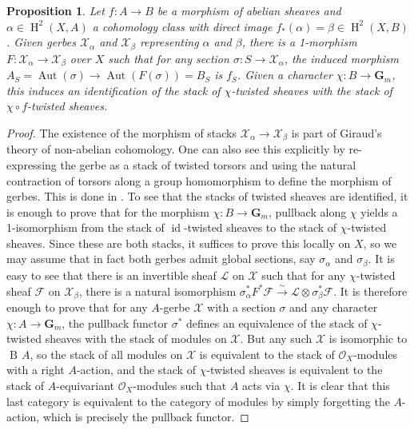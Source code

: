 \documentclass[11pt]{amsart}
\newcommand{\field}[1]{\mathbf #1}
\newcommand{\ms}[1]{\mathscr #1}
\newcommand{\simto}{\stackrel{\sim}{\to}}
\newcommand{\G}{\field G} %
\renewcommand{\H}{\operatorname{H}}
\renewcommand{\[}{[\!\hspace{0.03em}[}
\renewcommand{\]}{]\!\hspace{0.03em}]}
\renewcommand{\(}{(\!\hspace{0.03em}(}
\renewcommand{\)}{)\!\hspace{0.03em})}
\DeclareMathOperator*{\tensor}{\otimes}
\newcommand{\id}{\operatorname{id}}
\DeclareMathOperator{\aut}{\operatorname{Aut}}
\DeclareMathOperator{\B}{\operatorname{B\!}}
\newtheorem{prop}[lem]{Proposition}
\theoremstyle{definition}
\theoremstyle{remark}
\begin{document}
\begin{prop}\label{L:comparison of gerbes} Let $f:A\to B$ be a morphism of abelian sheaves and 
$\alpha\in\H^{2}(X,A)$ a cohomology class with direct image
$f_{\ast}(\alpha)=\beta\in\H^{2}(X,B)$.  Given gerbes $\ms X_{\alpha}$ and $\ms 
X_{\beta}$ representing $\alpha$ and $\beta$, there is a 1-morphism 
$F:\ms X_{\alpha}\to\ms X_{\beta}$ over $X$ such that for any 
section $\sigma:S\to\ms X_{\alpha}$, the induced morphism 
$A_{S}=\aut(\sigma)\to\aut(F(\sigma))=B_{S}$ is $f_{S}$.  Given a character $\chi:B\to\G_m$, this induces an identification of the stack of $\chi$-twisted sheaves with the stack of $\chi\circ f$-twisted sheaves.
\end{prop}
\begin{proof} The existence of the morphism of stacks $\ms 
X_{\alpha}\to\ms X_{\beta}$ is part of 
Giraud's theory of non-abelian cohomology.  One can also see this 
explicitly by re-expressing the gerbe as a stack of twisted torsors and using the natural contraction of torsors along a group homomorphism to define the morphism of gerbes.  
This is done in \cite{mythesis}.  To see that the stacks of twisted sheaves are identified, it is enough to prove that for the morphism $\chi:B\to\G_m$, pullback along $\chi$ yields a 1-isomorphism from the stack of $\id$-twisted sheaves to the stack of $\chi$-twisted sheaves.  Since these are both stacks, it suffices to prove this locally on $X$, so we may assume that in fact both gerbes admit global sections, say $\sigma_{\alpha}$ and $\sigma_{\beta}$.  It is easy to see that there is an invertible sheaf $\ms L$ on $\ms X$ such that for any $\chi$-twisted sheaf $\ms F$ on $\ms X_{\beta}$, there is a natural isomorphism $\sigma_{\alpha}^{\ast}F^{\ast}\ms F\simto\ms L\tensor\sigma_{\beta}^{\ast}\ms F$.  It is therefore enough to prove that for any $A$-gerbe $\ms X$ with a section $\sigma$ and any character $\chi:A\to\G_m$, the pullback functor $\sigma^{\ast}$ defines an equivalence of the stack of $\chi$-twisted sheaves with the stack of modules on $\ms X$.  But any such $\ms X$ is isomorphic to $\B{A}$, so the stack of all modules on $\ms X$ is equivalent to the stack of $\ms O_X$-modules with a right $A$-action, and the stack of $\chi$-twisted sheaves is equivalent to the stack of $A$-equivariant $\ms O_X$-modules such that $A$ acts via $\chi$.  It is clear that this last category is equivalent to the category of modules by simply forgetting the $A$-action, which is precisely the pullback functor.
\end{proof}
\end{document}
